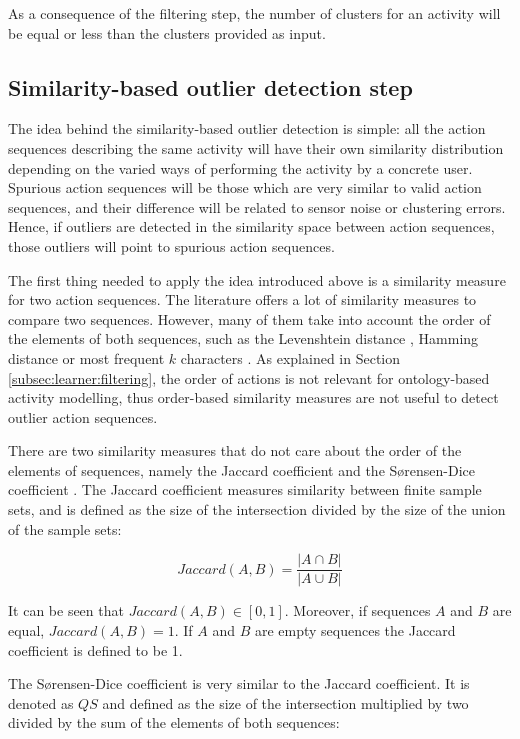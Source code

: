 As a consequence of the filtering step, the number of clusters for an activity will be equal or less than the clusters provided as input.


\subsection{Similarity-based outlier detection step}
\label{subsec:learner:outlier}
The idea behind the similarity-based outlier detection is simple: all the action sequences describing the same activity will have their own similarity distribution depending on the varied ways of performing the activity by a concrete user. Spurious action sequences will be those which are very similar to valid action sequences, and their difference will be related to sensor noise or clustering errors. Hence, if outliers are detected in the similarity space between action sequences, those outliers will point to spurious action sequences. 

The first thing needed to apply the idea introduced above is a similarity measure for two action sequences. The literature offers a lot of similarity measures to compare two sequences. However, many of them take into account the order of the elements of both sequences, such as the Levenshtein distance \cite{Levenshtein1966}, Hamming distance \cite{Hamming1950} or most frequent $k$ characters \cite{Seker2014}. As explained in Section \ref{subsec:learner:filtering}, the order of actions is not relevant for ontology-based activity modelling, thus order-based similarity measures are not useful to detect outlier action sequences.

There are two similarity measures that do not care about the order of the elements of sequences, namely the Jaccard coefficient \cite{A.K.Jain1988} and the S{\o}rensen-Dice coefficient \cite{Sorensen1948}. The Jaccard coefficient measures similarity between finite sample sets, and is defined as the size of the intersection divided by the size of the union of the sample sets:

\begin{equation}
\label{eq-jaccard}
  Jaccard(A, B) = \frac{|A \cap B|}{|A \cup B|}
 \end{equation}

It can be seen that $Jaccard(A, B) \in [0, 1]$. Moreover, if sequences $A$ and $B$ are equal, $Jaccard(A, B) = 1$. If $A$ and $B$ are empty sequences the Jaccard coefficient is defined to be 1.

The S{\o}rensen-Dice coefficient is very similar to the Jaccard coefficient. It is denoted as $QS$ and defined as the size of the intersection multiplied by two divided by the sum of the elements of both sequences:


